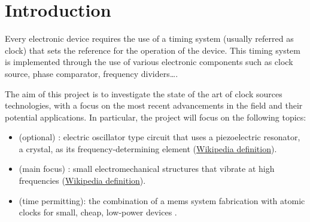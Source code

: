 \section{Introduction}

Every electronic device requires the use of a timing system (usually referred as clock) that sets the reference for the operation of the device.
This timing system is implemented through the use of various electronic components such as clock source, phase comparator, frequency dividers\dots.

The aim of this project is to investigate the state of the art of clock sources technologies, with a focus on the most recent advancements in the field and their potential applications.
In particular, the project will focus on the following topics:

\begin{itemize}
    \item {} (optional) : electric oscillator type circuit that uses a piezoelectric resonator, a crystal, as its frequency-determining element (\href{https://en.wikipedia.org/wiki/Crystal_oscillator#Terminology}{Wikipedia definition}).
    \item {} (main focus) : small electromechanical structures that vibrate at high frequencies (\href{https://en.wikipedia.org/wiki/Microelectromechanical_system_oscillator#Resonators}{Wikipedia definition}).
    \item {} (time permitting): the combination of a \acrshort{mems} system fabrication with atomic clocks for small, cheap, low-power devices \cite{KNAPPE2008571}.
\end{itemize}

